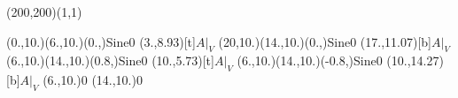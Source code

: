 \unitlength=1bp%

\begin{feynartspicture}(200,200)(1,1)

\FADiagram{}
\FAProp(0.,10.)(6.,10.)(0.,){Sine}{0}
\FALabel(3.,8.93)[t]{$A|_V$}
\FAProp(20,10.)(14.,10.)(0.,){Sine}{0}
\FALabel(17.,11.07)[b]{$A|_V$}
\FAProp(6.,10.)(14.,10.)(0.8,){Sine}{0}
\FALabel(10.,5.73)[t]{$A|_V$}
\FAProp(6.,10.)(14.,10.)(-0.8,){Sine}{0}
\FALabel(10.,14.27)[b]{$A|_V$}
\FAVert(6.,10.){0}
\FAVert(14.,10.){0}
\end{feynartspicture}

